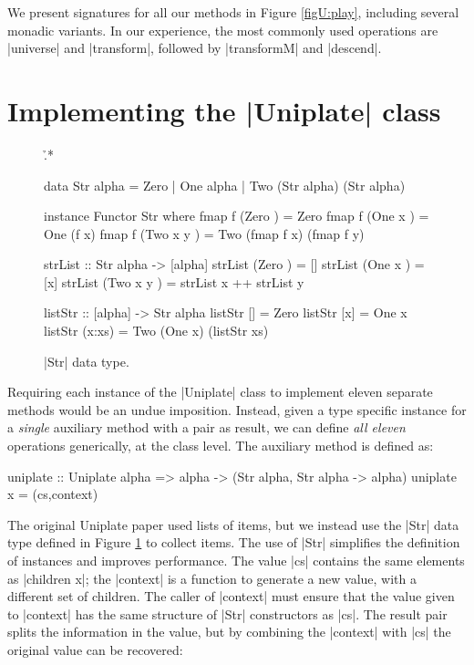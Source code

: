 We present signatures for all our methods in Figure \ref{figU:play}, including several monadic variants. In our experience, the most commonly used operations are |universe| and |transform|, followed by |transformM| and |descend|.


\section{Implementing the |Uniplate| class}
\label{secU:implement_play}

\begin{figure}
\h{.*}\begin{code}
data Str alpha = Zero | One alpha | Two (Str alpha) (Str alpha)

instance Functor Str where
    fmap f (Zero      ) = Zero
    fmap f (One  x    ) = One (f x)
    fmap f (Two  x y  ) = Two (fmap f x) (fmap f y)

strList :: Str alpha -> [alpha]
strList (Zero      ) = []
strList (One  x    ) = [x]
strList (Two  x y  ) = strList x ++ strList y

listStr :: [alpha] -> Str alpha
listStr []      = Zero
listStr [x]     = One x
listStr (x:xs)  = Two (One x) (listStr xs)
\end{code}
\caption{|Str| data type.}
\label{figU:str}
\end{figure}

Requiring each instance of the |Uniplate| class to implement eleven separate methods would be an undue imposition. Instead, given a type specific instance for a \textit{single} auxiliary method with a pair as result, we can define \textit{all eleven} operations generically, at the class level. The auxiliary method is defined as:

\ignore\begin{code}
uniplate :: Uniplate alpha => alpha -> (Str alpha, Str alpha -> alpha)
uniplate x = (cs,context)
\end{code}

The original Uniplate paper \cite{me:uniplate} used lists of items, but we instead use the |Str| data type defined in Figure \ref{figU:str} to collect items. The use of |Str| simplifies the definition of instances and improves performance. The value |cs| contains the same elements as |children x|; the |context| is a function to generate a new value, with a different set of children. The caller of |context| must ensure that the value given to |context| has the same structure of |Str| constructors as |cs|. The result pair splits the information in the value, but by combining the |context| with |cs| the original value can be recovered:

